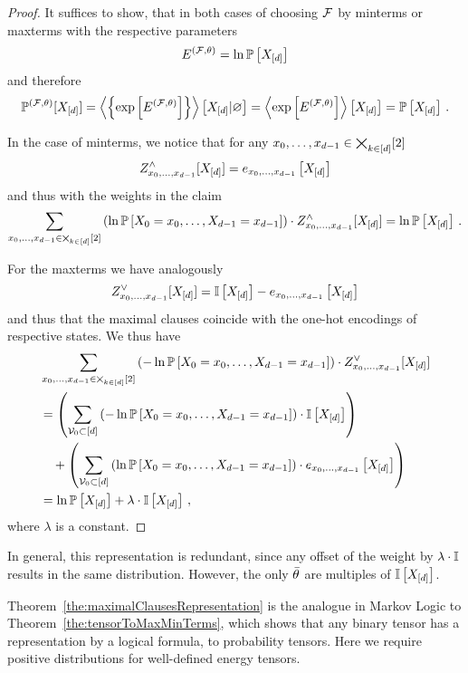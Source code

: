 \begin{proof}
	It suffices to show, that in both cases of choosing $\mathcal{F}$ by minterms or maxterms with the respective parameters
		\[ E^{(\mathcal{F},\theta)} =  \ln\mathbb{P}\left[X_{[d]}\right] \]
	and therefore
		\[ \mathbb{P}^{(\mathcal{F},\theta)}[X_{[d]}] 
		= \left\langle \left\{\mathrm{exp}\left[E^{(\mathcal{F},\theta)}\right]\right\}\right\rangle \left[ X_{[d]} | \varnothing \right] 
		=  \left\langle \mathrm{exp}\left[E^{(\mathcal{F},\theta)}\right]\right\rangle \left[ X_{[d]} \right] 
		= \mathbb{P}\left[X_{[d]}\right]\, . \]
	
	In the case of minterms, we notice that for any ${x_{0},\ldots,x_{d-1}}\in\bigtimes_{k\in[d]}[2]$
		\[ Z^{\land}_{{x_{0},\ldots,x_{d-1}}}[X_{[d]}] = e_{{x_{0},\ldots,x_{d-1}}}\left[X_{[d]}\right] \]
	and thus with the weights in the claim
		\[ \sum_{{x_{0},\ldots,x_{d-1}}\in\bigtimes_{k\in[d]}[2]} 
		\left( \ln \mathbb{P}\left[X_{0}=x_{0},\ldots,X_{d-1}=x_{d-1}\right] \right) \cdot Z^{\land}_{{x_{0},\ldots,x_{d-1}}}[X_{[d]}] 
		= \ln\mathbb{P}\left[X_{[d]}\right] \, .
		 \]

	For the maxterms we have analogously
		\[ Z^{\lor}_{{x_{0},\ldots,x_{d-1}}}[X_{[d]}] = \mathbb{I}\left[X_{[d]}\right] - e_{x_{0},\ldots,x_{d-1}}\left[X_{[d]}\right] \]
	and thus that the maximal clauses coincide with the one-hot encodings of respective states.
	We thus have
	\begin{align*}
		& \sum_{{x_{0},\ldots,x_{d-1}}\in\bigtimes_{k\in[d]}[2]} 
		\left( - \ln \mathbb{P}\left[X_{0}=x_{0},\ldots,X_{d-1}=x_{d-1}\right] \right) \cdot Z^{\lor}_{{x_{0},\ldots,x_{d-1}}}[X_{[d]}] \\
		& =
		\left(  \sum_{\mathcal{V}_0\subset [d]} 
		\left( - \ln \mathbb{P}\left[X_{0}=x_{0},\ldots,X_{d-1}=x_{d-1}\right] \right) \cdot \mathbb{I}\left[X_{[d]}\right] \right) \\
		& \quad + 
		\left(  \sum_{\mathcal{V}_0\subset [d]} 
		\left(  \ln \mathbb{P}\left[X_{0}=x_{0},\ldots,X_{d-1}=x_{d-1}\right] \right) \cdot 
		e_{x_{0},\ldots,x_{d-1}}\left[X_{[d]}\right] 
		\right) 
		 \\
		 & = \ln\mathbb{P}\left[X_{[d]}\right] + \lambda \cdot  \mathbb{I}\left[X_{[d]}\right]\,,
	\end{align*}
	where $\lambda$ is a constant.
\end{proof}

In general, this representation is redundant, since any offset of the weight by $\lambda\cdot\mathbb{I}$ results in the same distribution.
However, the only $\bar{\theta}$ are multiples of $\mathbb{I}\left[X_{[d]}\right]$.

Theorem~\ref{the:maximalClausesRepresentation} is the analogue in Markov Logic to Theorem~\ref{the:tensorToMaxMinTerms}, which shows that any binary tensor has a representation by a logical formula, to probability tensors.
Here we require positive distributions for well-defined energy tensors.


